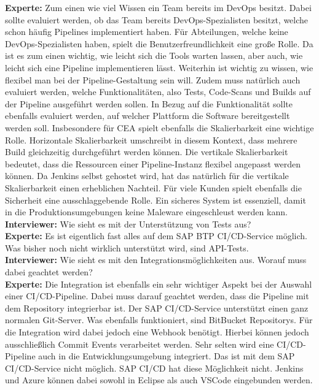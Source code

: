 \begin{linenumbers}
\textbf{Experte:} Zum einen wie viel Wissen ein Team bereits im DevOps besitzt. Dabei sollte evaluiert werden, ob das Team bereits DevOps-Spezialisten besitzt, welche schon häufig Pipelines implementiert haben. Für Abteilungen, welche keine DevOps-Spezialisten haben, spielt die Benutzerfreundlichkeit eine große Rolle. Da ist es zum einen wichtig, wie leicht sich die Tools warten lassen, aber auch, wie leicht sich eine Pipeline implementieren lässt. Weiterhin ist wichtig zu wissen, wie flexibel man bei der Pipeline-Gestaltung sein will. Zudem muss natürlich auch evaluiert werden, welche Funktionalitäten, also Tests, Code-Scans und Builds auf der Pipeline ausgeführt werden sollen. In Bezug auf die Funktionalität sollte ebenfalls evaluiert werden, auf welcher Plattform die Software bereitgestellt werden soll. Insbesondere für CEA spielt ebenfalls die Skalierbarkeit eine wichtige Rolle. Horizontale Skalierbarkeit umschreibt in diesem Kontext, dass mehrere Build gleichzeitig durchgeführt werden können. Die vertikale Skalierbarkeit bedeutet, dass die Ressourcen einer Pipeline-Instanz flexibel angepasst werden können. Da Jenkins selbst gehostet wird, hat das natürlich für die vertikale Skalierbarkeit einen erheblichen Nachteil. Für viele Kunden spielt ebenfalls die Sicherheit eine ausschlaggebende Rolle. Ein sicheres System ist essenziell, damit in die Produktionsumgebungen keine Maleware eingeschleust werden kann.\\ 
\textbf{Interviewer:} Wie sieht es mit der Unterstützung von Tests aus?\\
\textbf{Experte:} Es ist eigentlich fast alles auf dem SAP BTP CI/CD-Service möglich. Was bisher noch nicht wirklich unterstützt wird, sind API-Tests.\\
\textbf{Interviewer:} Wie sieht es mit den Integrationsmöglichkeiten aus. Worauf muss dabei geachtet werden?\\
\textbf{Experte:} Die Integration ist ebenfalls ein sehr wichtiger Aspekt bei der Auswahl einer CI/CD-Pipeline. Dabei muss darauf geachtet werden, dass die Pipeline mit dem Repository integrierbar ist. Der SAP CI/CD-Service unterstützt einen ganz normalen Git-Server. Was ebenfalls funktioniert, sind BitBucket Repositorys. Für die Integration wird dabei jedoch eine Webhook benötigt. Hierbei können jedoch ausschließlich Commit Events verarbeitet werden. Sehr selten wird eine CI/CD-Pipeline auch in die Entwicklungsumgebung integriert. Das ist mit dem SAP CI/CD-Service nicht möglich. SAP CI/CD hat diese Möglichkeit nicht. Jenkins und Azure können dabei sowohl in Eclipse als auch VSCode eingebunden werden.\\

\end{linenumbers}
